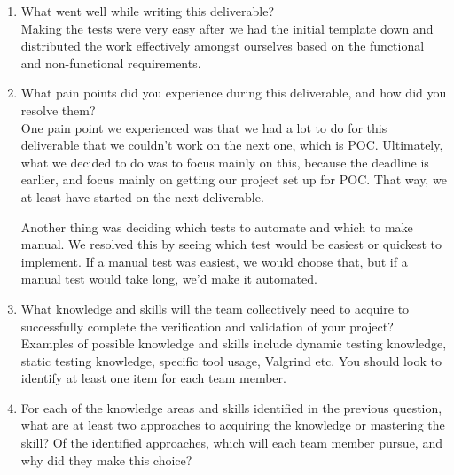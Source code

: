 \documentclass[12pt, titlepage]{article}
\begin{document}
\begin{enumerate}
  \item What went well while writing this deliverable? \\
  
  Making the tests were very easy after we had the initial template down and distributed the work effectively amongst ourselves based on the functional and non-functional requirements.
  
  \item What pain points did you experience during this deliverable, and how
    did you resolve them?\\

    One pain point we experienced was that we had a lot to do for this deliverable that we couldn't work on the next one, which is POC. Ultimately, what we decided to do was to focus mainly on this, because the deadline is earlier, and focus mainly on getting our project set up for POC. That way, we at least have started on the next deliverable.

    Another thing was deciding which tests to automate and which to make manual. We resolved this by seeing which test would be easiest or quickest to implement. If a manual test was easiest, we would choose that, but if a manual test would take long, we'd make it automated.\\
    
  \item What knowledge and skills will the team collectively need to acquire to
  successfully complete the verification and validation of your project?
  Examples of possible knowledge and skills include dynamic testing knowledge,
  static testing knowledge, specific tool usage, Valgrind etc.  You should look to
  identify at least one item for each team member.\\

    
  
  \item For each of the knowledge areas and skills identified in the previous
  question, what are at least two approaches to acquiring the knowledge or
  mastering the skill?  Of the identified approaches, which will each team
  member pursue, and why did they make this choice?
\end{enumerate}
\end{document}
